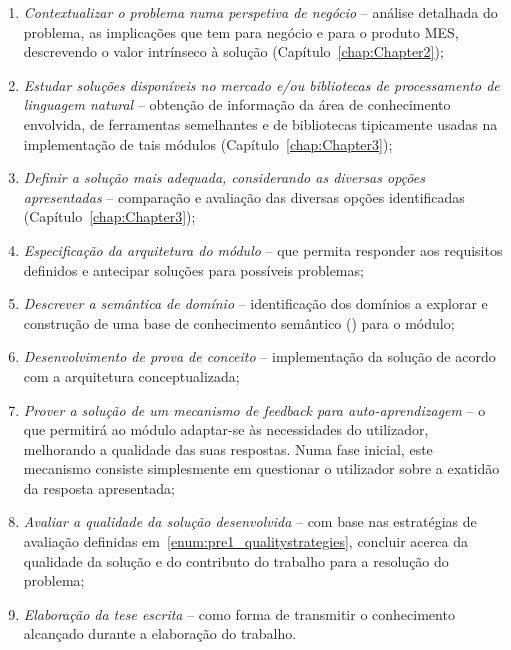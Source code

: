 \begin{enumerate}
    \item
    \label{enum:pre1_objectives_1}
    {
        \textit{Contextualizar o problema numa perspetiva de negócio} -- análise detalhada do problema, as implicações que tem para negócio e para o produto \gls{MES}, descrevendo o valor intrínseco à solução (Capítulo~\ref{chap:Chapter2});
    }
    \item
    \label{enum:pre1_objectives_2}
    {
        \textit{Estudar soluções disponíveis no mercado e/ou bibliotecas de processamento de linguagem natural} -- obtenção de informação da área de conhecimento envolvida, de ferramentas semelhantes e de bibliotecas tipicamente usadas na implementação de tais módulos (Capítulo~\ref{chap:Chapter3});
    }
    \item
    \label{enum:pre1_objectives_3}
    {
        \textit{Definir a solução mais adequada, considerando as diversas opções apresentadas} -- comparação e avaliação das diversas opções identificadas (Capítulo~\ref{chap:Chapter3});
    }
    \item
    \label{enum:pre1_objectives_4}
    {
        \textit{Especificação da arquitetura do módulo} -- que permita responder aos requisitos definidos e antecipar soluções para possíveis problemas;
    }
    \item
    \label{enum:pre1_objectives_5}
    {
        \textit{Descrever a semântica de domínio} -- identificação dos domínios a explorar e construção de uma base de conhecimento semântico () para o módulo;
    }
    \item
    \label{enum:pre1_objectives_6}
    {
        \textit{Desenvolvimento de prova de conceito} -- implementação da solução de acordo com a arquitetura conceptualizada;
    }
    \item
    \label{enum:pre1_objectives_7}
    {
        \textit{Prover a solução de um mecanismo de feedback para auto-aprendizagem} -- o que permitirá ao módulo adaptar-se às necessidades do utilizador, melhorando a qualidade das suas respostas. Numa fase inicial, este mecanismo consiste simplesmente em questionar o utilizador sobre a exatidão da resposta apresentada;
    }
    
    \item
    \label{enum:pre1_objectives_8}
    {
        \textit{Avaliar a qualidade da solução desenvolvida} -- com base nas estratégias de avaliação definidas em~\ref{enum:pre1_qualitystrategies}, concluir acerca da qualidade da solução e do contributo do trabalho para a resolução do problema;
    }
    \item
    \label{enum:pre1_objectives_9}
    {
        \textit{Elaboração da tese escrita} -- como forma de transmitir o conhecimento alcançado durante a elaboração do trabalho.
    }
\end{enumerate}

